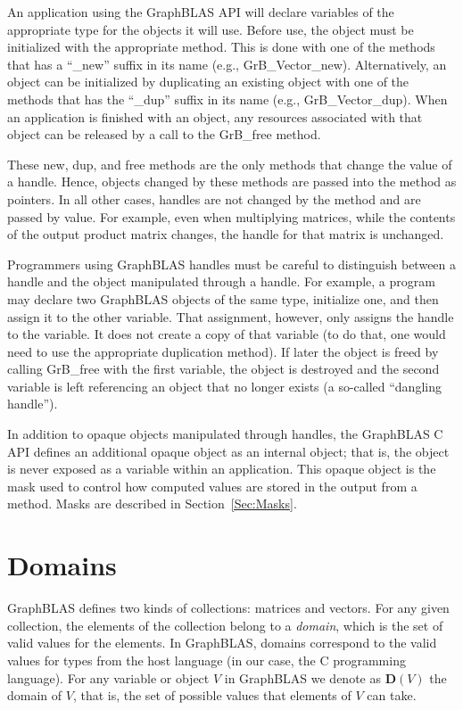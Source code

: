 An application using the GraphBLAS API will declare variables of the appropriate
type for the objects it will use.  Before use, the object must be initialized with 
the appropriate method.  This is done with one of the methods that has a ``{\sf \_new}'' suffix in its 
name (e.g., {\sf GrB\_Vector\_new}).  Alternatively, an object can be initialized by duplicating
an existing object with one of the methods that has the ``{\sf \_dup}'' suffix in its 
name  (e.g., {\sf GrB\_Vector\_dup}).   When an application is finished with 
an object, any resources associated with that object can be released by a
call to the {\sf GrB\_free} method.    

These {\sf new}, {\sf dup}, and {\sf free} methods are the only methods that 
change the value of a handle.  Hence, objects changed by these methods are passed
into the method as pointers.  In all other cases, handles are not changed by the 
method and are passed by value.  For example, even when multiplying matrices, 
while the contents of the output product matrix changes, the handle for that matrix is unchanged. 

Programmers using GraphBLAS handles must be careful to distinguish between a handle and the 
object manipulated through a handle.  For example, a program may declare two 
GraphBLAS objects of the same type, initialize one, and then assign it to the other
variable.  That assignment, however, only assigns the handle to the variable.  It does not 
create a copy of that variable (to do that, one would need to use the appropriate duplication method).
If later the object is freed by calling {\sf GrB\_free} with the first variable, the object
is destroyed and the second variable is left referencing an object that no longer 
exists (a so-called ``dangling handle'').

In addition to opaque objects manipulated through handles, the GraphBLAS C API defines
an additional opaque object as an internal object; that is, the object is never exposed as
a variable within an application.  This opaque object is the mask used to
control how computed values are stored in the output from a method.  Masks 
are described in Section~\ref{Sec:Masks}.

\section{Domains}

GraphBLAS defines two kinds of collections: matrices and vectors.
For any given collection, the elements of the collection belong to
a \emph{domain}, which is the set of valid values for the elements.
In GraphBLAS, domains correspond to the valid values for types from the
host language (in our case, the C programming language).  For any variable
or object $V$ in GraphBLAS we denote as $\mathbf{D}(V)$ the domain of $V$,
that is, the set of possible values that elements of $V$ can take.

